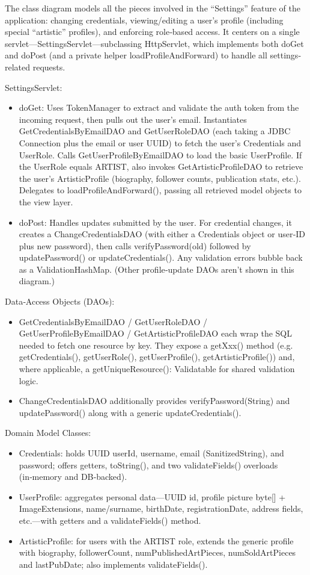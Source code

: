 The class diagram models all the pieces involved in the “Settings” feature of the application: changing credentials, viewing/editing a user’s profile (including special “artistic” profiles), and enforcing role‐based access. It centers on a single servlet—SettingsServlet—subclassing HttpServlet, which implements both doGet and doPost (and a private helper loadProfileAndForward) to handle all settings‐related requests.

SettingsServlet:
\begin{itemize}
    \item doGet: Uses TokenManager to extract and validate the auth token from the incoming request, then pulls out the user’s email.
    Instantiates GetCredentialsByEmailDAO and GetUserRoleDAO (each taking a JDBC Connection plus the email or user UUID) to fetch the user’s Credentials and UserRole.
    Calls GetUserProfileByEmailDAO to load the basic UserProfile.
    If the UserRole equals ARTIST, also invokes GetArtisticProfileDAO to retrieve the user’s ArtisticProfile (biography, follower counts, publication stats, etc.).
    Delegates to loadProfileAndForward(), passing all retrieved model objects to the view layer.
    \item doPost: Handles updates submitted by the user. For credential changes, it creates a ChangeCredentialsDAO (with either a Credentials object or user‐ID plus new password), then calls verifyPassword(old) followed by updatePassword() or updateCredentials(). Any validation errors bubble back as a ValidationHashMap. (Other profile‐update DAOs aren’t shown in this diagram.)
\end{itemize}

Data‐Access Objects (DAOs):
\begin{itemize}
    \item GetCredentialsByEmailDAO / GetUserRoleDAO / GetUserProfileByEmailDAO / GetArtisticProfileDAO each wrap the SQL needed to fetch one resource by key. They expose a getXxx() method (e.g. getCredentials(), getUserRole(), getUserProfile(), getArtisticProfile()) and, where applicable, a getUniqueResource(): Validatable for shared validation logic.
    \item ChangeCredentialsDAO additionally provides verifyPassword(String) and updatePassword() along with a generic updateCredentials().
\end{itemize}

Domain Model Classes:
\begin{itemize}
    \item Credentials: holds UUID userId, username, email (SanitizedString), and password; offers getters, toString(), and two validateFields() overloads (in‑memory and DB‐backed).
    \item UserProfile: aggregates personal data—UUID id, profile picture byte[] + ImageExtensions, name/surname, birthDate, registrationDate, address fields, etc.—with getters and a validateFields() method.
    \item ArtisticProfile: for users with the ARTIST role, extends the generic profile with biography, followerCount, numPublishedArtPieces, numSoldArtPieces and lastPubDate; also implements validateFields().
\end{itemize}

